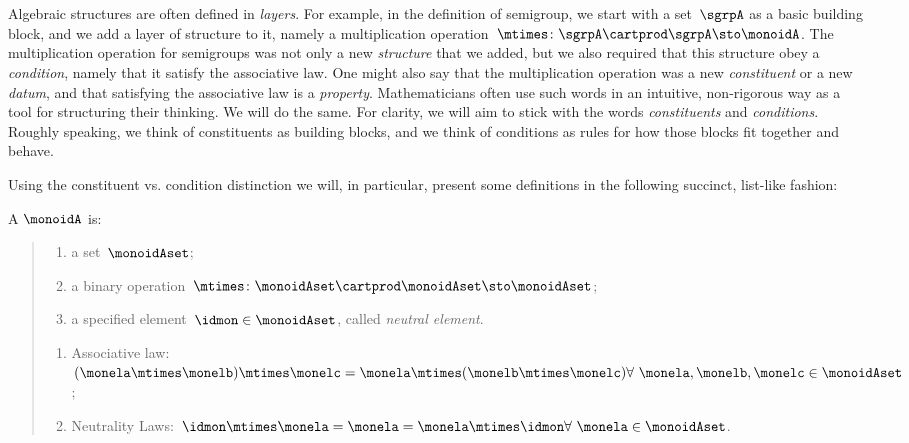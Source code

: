 

\section{}
\label{sec:parallelism-monoids}


Algebraic structures are often defined in \emph{layers}.
For example, in the definition of semigroup, we start with a set~$\sgrpA$ as a basic building block, and we add a layer of structure to it, namely a multiplication operation~$\mtimes \colon \sgrpA \cartprod \sgrpA \sto \monoidA$.
The multiplication operation for semigroups was not only a new \emph{structure} that we added, but we also required that this structure obey a \emph{condition}, namely that it satisfy the associative law.
One might also say that the multiplication operation was a new \emph{constituent} or a new \emph{datum}, and that satisfying the associative law is a \emph{property}.
Mathematicians often use such words in an intuitive, non-rigorous way as a tool for structuring their thinking.
We will do the same.
For clarity, we will aim to stick with the words \emph{constituents} and \emph{conditions}.
Roughly speaking, we think of constituents as building blocks, and we think of conditions as rules for how those blocks fit together and behave.

Using the constituent vs. condition distinction we will, in particular, present some definitions in the following succinct, list-like fashion:

\begin{ctdefinition}[Monoid]
  \label{def:monoid}
  A \emph{}  $\monoidA$  is:
  \begin{quote}
    \constit
    \begin{enumerate}
      \item a set~$\monoidAset$;
      \item a binary operation~$\mtimes  \colon \monoidAset \cartprod \monoidAset \sto \monoidAset$;
      \item a specified element~$\idmon \in \monoidAset$, called \emph{neutral element}.
    \end{enumerate}
    \condit
    \begin{enumerate}
      \item Associative law:~$(\monela\mtimes  \monelb)\mtimes  \monelc=
      \monela\mtimes  (\monelb\mtimes  \monelc) \hfill  \forall \  \monela, \monelb, \monelc \in \monoidAset$;
      \item Neutrality Laws:~$\idmon\mtimes \monela=\monela=\monela\mtimes  \idmon \hfill  \forall \ \monela \in \monoidAset $.
    \end{enumerate}
  \end{quote}
\end{ctdefinition}


